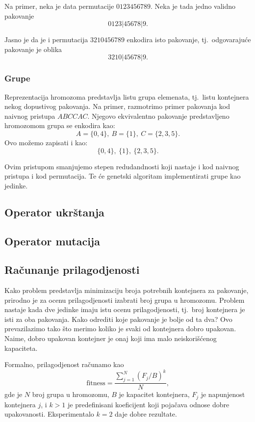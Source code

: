 \documentclass[a4paper,12pt,twocolumn]{article}
\begin{document}
Na primer, neka je data permutacije $0123456789$. Neka je tada jedno 
validno pakovanje 
\[0123|45678|9.\]

Jasno je da je i permutacija $3210456789$ enkodira isto pakovanje, tj.\ 
odgovarajuće pakovanje je oblika
\[3210|45678|9.\]

\subsubsection{Grupe}

Reprezentacija hromozoma predstavlja listu grupa elemenata, tj.\ listu
kontejnera nekog dopustivog pakovanja. Na primer, razmotrimo primer pakovanja
kod naivnog pristupa $ABCCAC$. Njegovo ekvivalentno pakovanje predstavljeno
hromozomom grupa se enkodira kao:
\[
    A=\{0, 4\},\ B=\{1\},\ C=\{2, 3, 5\}.
\]
Ovo možemo zapisati i kao:
\[
    \{0, 4\},\ \{1\},\ \{2, 3, 5\}.
\]

Ovim pristupom smanjujemo stepen redudandnosti koji nastaje i kod naivnog 
pristupa i kod permutacija. Te će genetski algoritam implementirati grupe
kao jedinke.

\subsection{Operator ukrštanja}



\subsection{Operator mutacija}

\subsection{Računanje prilagodjenosti}

Kako problem predstavlja minimizaciju broja potrebnih kontejnera za pakovanje,
prirodno je za ocenu prilagodjenosti izabrati broj grupa u hromozomu.
Problem nastaje kada dve jedinke imaju istu ocenu prilagodjenosti, tj.\ 
broj kontejnera je isti za oba pakovanja. Kako odrediti koje pakovanje je
bolje od ta dva? Ovo prevazilazimo tako što merimo koliko je svaki od 
kontejnera dobro upakovan. Naime, dobro upakovan kontejner je onaj koji
ima malo neiskorišćenog kapaciteta.

Formalno, prilagodjenost računamo kao
\begin{equation}
    \text{fitness} = \frac{\sum_{j = 1}^N {(F_j/B)}^k}{N},
\end{equation}
gde je $N$ broj grupa u hromozomu, $B$ je kapacitet kontejnera, $F_j$
je napunjenost kontejnera $j$, i $k > 1$ je predefinisani koeficijent koji
pojačava odnose dobre upakovanosti. Eksperimentalo $k=2$ daje dobre 
rezultate\cite{f96}. 
\end{document}
